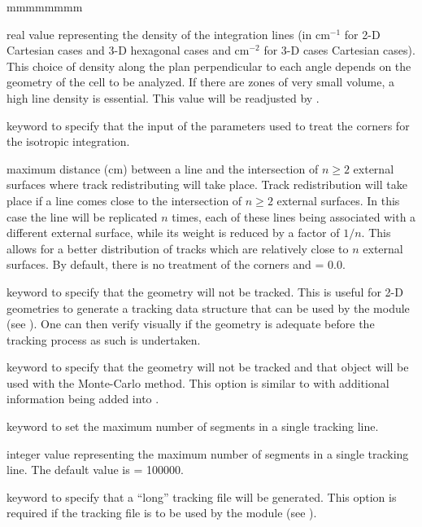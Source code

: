 \begin{ListeDeDescription}{mmmmmmmm}
\item[\dusa{dens}] real value representing the density of the integration lines (in cm$^{-1}$ for 2-D Cartesian cases and 
3-D hexagonal cases and cm$^{-2}$ for 3-D cases Cartesian cases). This choice of density along the 
plan perpendicular to each angle depends on the geometry of the cell to be analyzed. If there 
are zones of very small volume, a high line density is essential. This value will be readjusted by 
.

\item[\moc{CORN}] keyword to specify that the input of the parameters used to treat the corners for the isotropic 
integration. 

\item[\dusa{pcorn}] maximum distance (cm) between a line and the intersection of $n\ge 2$ external surfaces where 
track redistributing will take place. Track redistribution will take place if a line comes close to 
the intersection of $n \ge 2$ external surfaces. In this case the line will be replicated $n$ times, each 
of these lines being associated with a different external surface, while its weight is reduced by 
a factor of $1/n$. This allows for a better distribution of tracks which are relatively close to $n$ 
external surfaces. By default, there is no treatment of the corners and  = 0.0.

\item[\moc{NOTR}] keyword to specify that the geometry will not be tracked. This is useful for 2-D geometries 
to generate a tracking data structure that can be used by the  module (see ). 
One can then verify visually if the geometry is adequate before the tracking process as such is 
undertaken.

\item[\moc{MC}] keyword to specify that the geometry will not be tracked and that object  will be used with the
Monte-Carlo method. This option is similar to  with additional information being added into .

\item[\moc{NBSLIN}] keyword to set the maximum number of segments in a single tracking line.

\item[\dusa{nbsl}] integer value representing the maximum number of segments in a single tracking line. The default value is  = 100000.

\item[\moc{LONG}] keyword to specify that a ``long'' tracking file will be generated. This option is required if the tracking file is to be used by the  module (see ).


\end{ListeDeDescription}
